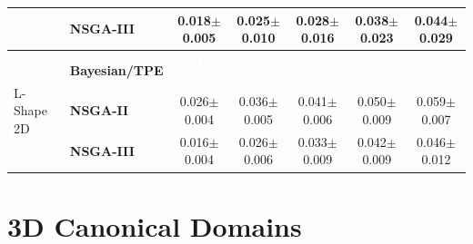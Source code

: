 \begin{table}[H]
\begin{tabular}{@{}llccccc@{}}
  & \textbf{NSGA-III} & \cellcolor{ForestGreen!25}0.018$\pm$0.005 & \cellcolor{ForestGreen!25}0.025$\pm$0.010 & \cellcolor{ForestGreen!25}0.028$\pm$0.016 & \cellcolor{ForestGreen!25}0.038$\pm$0.023 & \cellcolor{ForestGreen!25}0.044$\pm$0.029 \\
\midrule
\multirow{3}{*}{L-Shape 2D}
  & \textbf{Bayesian/TPE} & \cellcolor{ForestGreen!55}\textcolor{white}{\textbf{0.014$\pm$0.002}} & \cellcolor{ForestGreen!55}\textcolor{white}{\textbf{0.017$\pm$0.002}} & \cellcolor{ForestGreen!55}\textcolor{white}{\textbf{0.016$\pm$0.004}} & \cellcolor{ForestGreen!55}\textcolor{white}{\textbf{0.020$\pm$0.005}} & \cellcolor{ForestGreen!55}\textcolor{white}{\textbf{0.021$\pm$0.005}} \\
  & \textbf{NSGA-II} & \cellcolor{ForestGreen!25}0.026$\pm$0.004 & \cellcolor{ForestGreen!25}0.036$\pm$0.005 & \cellcolor{ForestGreen!25}0.041$\pm$0.006 & \cellcolor{ForestGreen!25}0.050$\pm$0.009 & \cellcolor{ForestGreen!25}0.059$\pm$0.007 \\
  & \textbf{NSGA-III} & \cellcolor{ForestGreen!25}0.016$\pm$0.004 & \cellcolor{ForestGreen!25}0.026$\pm$0.006 & \cellcolor{ForestGreen!25}0.033$\pm$0.009 & \cellcolor{ForestGreen!25}0.042$\pm$0.009 & \cellcolor{ForestGreen!25}0.046$\pm$0.012 \\
\bottomrule
\end{tabular}
\end{table}


\section*{3D Canonical Domains}

